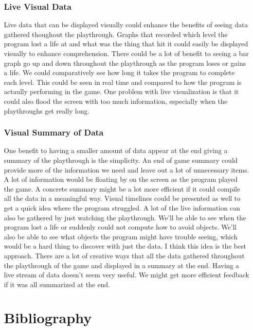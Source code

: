 \documentclass{scrreprt}
\begin{document}
\subsection{Live Visual Data}
Live data that can be displayed visually could enhance the benefits of seeing data gathered thoughout the playthrough.
Graphs that recorded which level the program lost a life at and what was the thing that hit it could easily be displayed visually to enhance comprehension.
There could be a lot of benefit to seeing a bar graph go up and down throughout the playthrough as the program loses or gains a life.
We could comparatively see how long it takes the program to complete each level.
This could be seen in real time and compared to how the program is actaully performing in the game.
One problem with live visualization is that it could also flood the screen with too much information, especially when the playthroughs get really long.

\subsection{Visual Summary of Data}
One benefit to having a smaller amount of data appear at the end giving a summary of the playthrough is the simplicity.
An end of game summary could provide more of the information we need and leave out a lot of unnecessary items.
A lot of information would be floating by on the screen as the program played the game.
A concrete summary might be a lot more efficient if it could compile all the data in a meaningful way.
Visual timelines could be presented as well to get a quick idea where the program struggled.
A lot of the live information can also be gathered by just watching the playthrough.
We'll be able to see when the program lost a life or suddenly could not compute how to avoid objects.
We'll also be able to see what objects the program might have trouble seeing, which would be a hard thing to discover with just the data.
I think this idea is the best approach.
There are a lot of creative ways that all the data gathered throughout the playthrough of the game and displayed in a summary at the end.
Having a live stream of data doesn't seem very useful.
We might get more efficient feedback if it was all summarized at the end.





\chapter{Bibliography}
\end{document}
